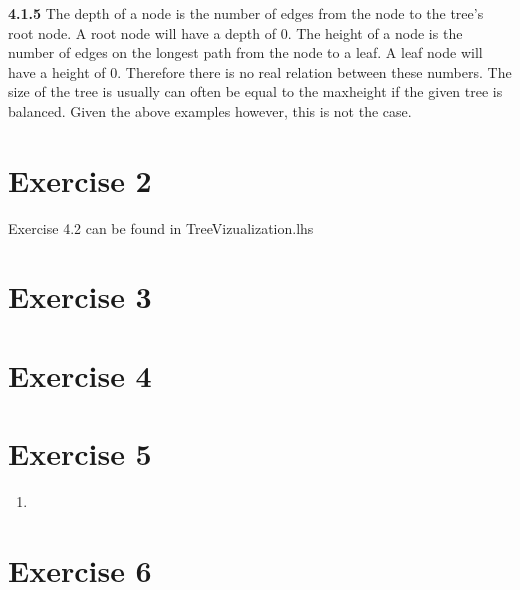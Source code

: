 \documentclass{article}
\begin{document}
\textbf{4.1.5}
The depth of a node is the number of edges from the node to the tree's root node.
A root node will have a depth of 0.
The height of a node is the number of edges on the longest path from the node to a leaf.
A leaf node will have a height of 0. Therefore there is no real relation between these numbers. The size of the tree is usually can often be equal to the maxheight if the given tree is balanced. Given the above examples however, this is not the case. 

\section*{Exercise 2}
Exercise 4.2 can be found in TreeVizualization.lhs

\section*{Exercise 3}


\section*{Exercise 4}

\section*{Exercise 5}
\begin{enumerate}
  \item
\end{enumerate}

\section*{Exercise 6}
\end{document}
